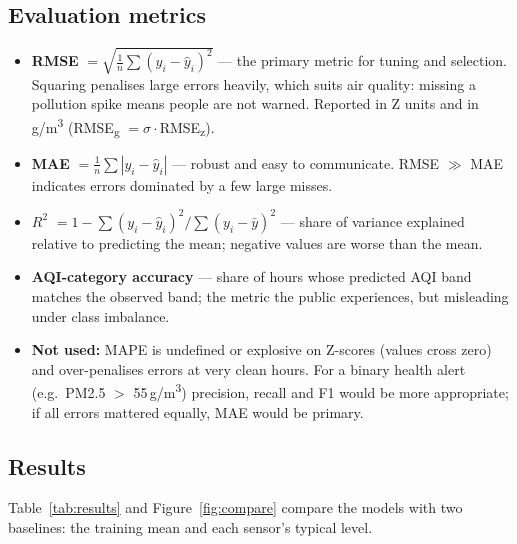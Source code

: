 \documentclass[11pt,a4paper]{article}
\newcommand{\ugm}{\,\textmu g/m\textsuperscript{3}}
\begin{document}
\subsection{Evaluation metrics}
\begin{itemize}
\item \textbf{RMSE} $=\sqrt{\tfrac{1}{n}\sum (y_i-\hat y_i)^2}$ --- the primary metric for tuning and selection. Squaring penalises large errors heavily, which suits air quality: missing a pollution spike means people are not warned. Reported in Z units and in \ugm{} (RMSE\textsubscript{\textmu g} $= \sigma\cdot$RMSE\textsubscript{z}).
\item \textbf{MAE} $=\tfrac{1}{n}\sum|y_i-\hat y_i|$ --- robust and easy to communicate. RMSE $\gg$ MAE indicates errors dominated by a few large misses.
\item \textbf{$R^2$} $=1-\sum(y_i-\hat y_i)^2/\sum(y_i-\bar y)^2$ --- share of variance explained relative to predicting the mean; negative values are worse than the mean.
\item \textbf{AQI-category accuracy} --- share of hours whose predicted AQI band matches the observed band; the metric the public experiences, but misleading under class imbalance.
\item \textbf{Not used:} MAPE is undefined or explosive on Z-scores (values cross zero) and over-penalises errors at very clean hours. For a binary health alert (e.g.\ PM2.5 $>$ 55\ugm) precision, recall and F1 would be more appropriate; if all errors mattered equally, MAE would be primary.
\end{itemize}

\subsection{Results}
Table~\ref{tab:results} and Figure~\ref{fig:compare} compare the models with two baselines: the training mean and each sensor's typical level.
\end{document}
